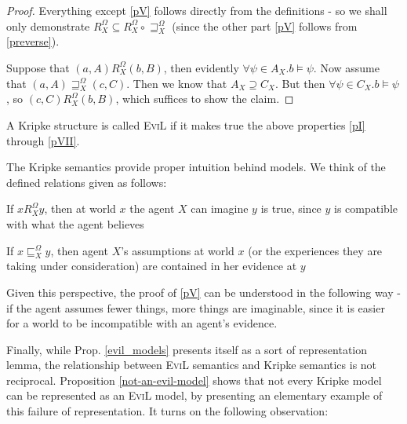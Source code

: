 \begin{proof}
  Everything except \ref{pV} follows directly from the definitions -
  so we shall only demonstrate 
$R^{\Omega}_X \subseteq R^{\Omega}_X \circ
  \sqsupseteq^{\Omega}_X$ (since the other part \ref{pV} follows from \ref{preverse}).
  
  Suppose that $(a, A) R^{\Omega}_X (b, B)$, then evidently $\forall \psi \in
  A_X .b \models \psi$. 
  Now assume that $(a, A) \sqsupseteq_X^{\Omega} (c,
  C)$.  Then we know that $A_X \supseteq C_X$.
  But then $\forall \psi \in
  C_X .b \models \psi$, so $(c, C) R^{\Omega}_X (b, B)$, which
  suffices to show the claim.
\end{proof}

\begin{definition}\label{evil-kripke-structures}
A Kripke structure is called \textsc{EviL} if it makes true the
  above properties \ref{pI} through \ref{pVII}.
\end{definition}


The Kripke semantics provide proper intuition behind
 models. We think of the defined relations given as follows:
\begin{itemizedot}
  \item If $x R^{\Omega}_X y$, then at world $x$ the agent $X$ can imagine $y$ is true, since $y$ is compatible with what the agent believes 
  \item If $x \sqsubseteq^{\Omega}_X y$, then agent $X$'s
  assumptions at world $x$ (or the experiences they are taking under consideration) are  contained in her evidence at $y$
\end{itemizedot}
Given this perspective, the proof of \ref{pV} can be understood in the
following way - if the agent assumes fewer things, more things are imaginable,
since it is easier for a world to be incompatible with an agent's evidence.

Finally, while Prop. \ref{evil_models} presents itself as a sort of
representation lemma, the relationship between \textsc{EviL} semantics
and Kripke semantics is not reciprocal.  Proposition
\ref{not-an-evil-model} shows that not every Kripke model can be
represented as an \textsc{EviL} model, 
by presenting an elementary example of  this failure of
representation.  It turns on the following observation:


